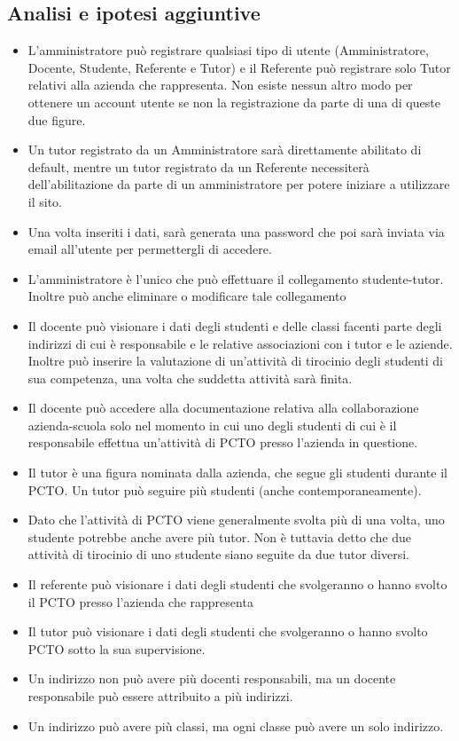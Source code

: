 \documentclass[12pt]{article}
\begin{document}
\subsection{Analisi e ipotesi aggiuntive}
\begin{itemize}
    \item L'amministratore può registrare qualsiasi tipo di utente (Amministratore, Docente, Studente, Referente e Tutor) e il Referente può registrare solo Tutor relativi alla azienda che rappresenta. Non esiste nessun altro modo per ottenere un account utente se non la registrazione da parte di una di queste due figure.
    \item Un tutor registrato da un Amministratore sarà direttamente abilitato di default, mentre un tutor registrato da un Referente necessiterà dell'abilitazione da parte di un amministratore per potere iniziare a utilizzare il sito.
    \item Una volta inseriti i dati, sarà generata una password che poi sarà inviata via email all'utente per permettergli di accedere.
    \item L'amministratore è l'unico che può effettuare il collegamento studente-tutor. Inoltre può anche eliminare o modificare tale collegamento
    \item Il docente può visionare i dati degli studenti e delle classi facenti parte degli indirizzi di cui è responsabile e le relative associazioni con i tutor e le aziende. Inoltre può inserire la valutazione di un'attività di tirocinio degli studenti di sua competenza, una volta che suddetta attività sarà finita.
    \item Il docente può accedere alla documentazione relativa alla collaborazione azienda-scuola solo nel momento in cui uno degli studenti di cui è il responsabile effettua un'attività di PCTO presso l'azienda in questione.
    \item Il tutor è una figura nominata dalla azienda, che segue gli studenti durante il PCTO. Un tutor può seguire più studenti (anche contemporaneamente).
    \item Dato che l'attività di PCTO viene generalmente svolta più di una volta, uno studente potrebbe anche avere più tutor. Non è tuttavia detto che due attività di tirocinio di uno studente siano seguite da due tutor diversi.
    \item Il referente può visionare i dati degli studenti che svolgeranno o hanno svolto il PCTO presso l'azienda che rappresenta
    \item Il tutor può visionare i dati degli studenti che svolgeranno o hanno svolto PCTO sotto la sua supervisione.
    \item Un indirizzo non può avere più docenti responsabili, ma un docente responsabile può essere attribuito a più indirizzi.
    \item Un indirizzo può avere più classi, ma ogni classe può avere un solo indirizzo.
    
\end{itemize}
\end{document}

